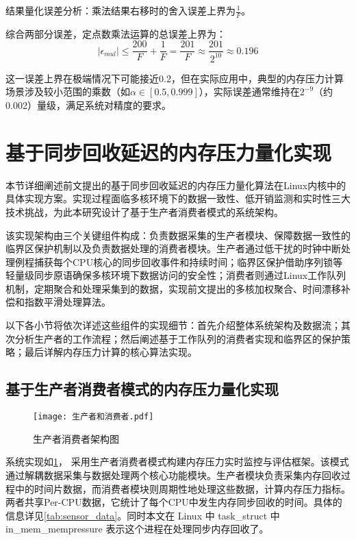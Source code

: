 结果量化误差分析：乘法结果右移时的舍入误差上界为$\frac{1}{F}$。

综合两部分误差，定点数乘法运算的总误差上界为：
\begin{equation}
|\epsilon_{mul}| \leq \frac{200}{F} + \frac{1}{F} = \frac{201}{F} \approx \frac{201}{2^{10}} \approx 0.196    
\end{equation}

这一误差上界在极端情况下可能接近0.2，但在实际应用中，典型的内存压力计算场景涉及较小范围的乘数（如\(\alpha \in [0.5, 0.999]\)），实际误差通常维持在\(2^{-9}\)（约0.002）量级，满足系统对精度的要求。

\section{基于同步回收延迟的内存压力量化实现}
\label{sec:基于同步回收延迟的内存压力量化实现}

本节详细阐述前文提出的基于同步回收延迟的内存压力量化算法在Linux内核中的具体实现方案。实现过程面临多核环境下的数据一致性、低开销监测和实时性三大技术挑战，为此本研究设计了基于生产者消费者模式的系统架构。

该实现架构由三个关键组件构成：负责数据采集的生产者模块、保障数据一致性的临界区保护机制以及负责数据处理的消费者模块。生产者通过低干扰的时钟中断处理例程捕获每个CPU核心的同步回收事件和持续时间；临界区保护借助序列锁等轻量级同步原语确保多核环境下数据访问的安全性；消费者则通过Linux工作队列机制，定期聚合和处理采集到的数据，实现前文提出的多核加权聚合、时间漂移补偿和指数平滑处理算法。

以下各小节将依次详述这些组件的实现细节：首先介绍整体系统架构及数据流；其次分析生产者的工作流程；然后阐述基于工作队列的消费者实现和临界区的保护策略；最后详解内存压力计算的核心算法实现。

\subsection{基于生产者消费者模式的内存压力量化实现}

\begin{figure}[H]
    \centering
    \texttt{[image: 生产者和消费者.pdf]}
    \caption{生产者消费者架构图}
    \label{fig:producer-consumer}
\end{figure}

系统实现如\ref{fig:producer-consumer}， 采用生产者消费者模式构建内存压力实时监控与评估框架。该模式通过解耦数据采集与数据处理两个核心功能模块。生产者模块负责采集内存回收过程中的时间片数据，而消费者模块则周期性地处理这些数据，计算内存压力指标。两者共享Per-CPU数据，它统计了每个CPU中发生内存同步回收的时间。具体的信息详见\ref{tab:sensor_data}。同时本文在 Linux 中 task\_struct 中 in\_mem\_mempressure 表示这个进程在处理同步内存回收了。

